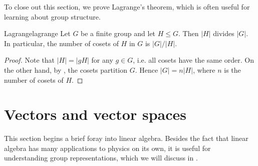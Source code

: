 To close out this section, we prove Lagrange's theorem, which is often useful
for learning about group structure.
\begin{theorem}{Lagrange}{lagrange}
Let $G$ be a finite group and let $H\leq G$. Then $|H|$ divides $|G|$.
In particular, the number of cosets of $H$ in $G$ is $|G|/|H|$.
\begin{proof}
Note that $|H|=|gH|$ for any $g\in G$, i.e. all cosets have the same
order. On the other hand, by , the cosets
partition $G$. Hence $|G|=n|H|$, where $n$ is the number of cosets of $H$.
\end{proof}
\end{theorem}


\section{Vectors and vector spaces}\label{sec:vectors}

  This section begins a brief foray into linear algebra.
  Besides the fact that linear algebra has many applications to
  physics on its own, it is useful for understanding group
  representations, which we will discuss in .

